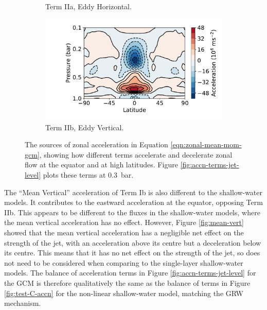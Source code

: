 \begin{figure}
\begin{subfigure}[t]{0.48\textwidth}
    \caption{Term IIa, Eddy Horizontal.}\label{fig:stat-horiz}
  \end{subfigure}
\quad
  \begin{subfigure}[t]{0.48\textwidth}
    \includegraphics[width=\textwidth]{figures/eqm-zonal-flow/3_flux.pdf}
    \caption{Term IIb, Eddy Vertical.}\label{fig:stat-vert}
  \end{subfigure}
  \caption{The sources of zonal acceleration in Equation \ref{eqn:zonal-mean-mom-gcm}, showing how different terms accelerate and decelerate zonal flow at the equator and at high latitudes. Figure \ref{fig:accn-terms-jet-level} plots these terms at \SI{0.3}{\bar}. }\label{fig:default-gcm-accelerations}
\end{figure}


The ``Mean Vertical'' acceleration of Term Ib is also different to the shallow-water models. It contributes to the eastward acceleration at the equator, opposing Term IIb. This appears to be different to the fluxes in the shallow-water models, where the mean vertical acceleration has no effect. However, Figure \ref{fig:mean-vert} showed that the mean vertical acceleration has a negligible net effect on the strength of the jet, with an acceleration above its centre but a deceleration below its centre. This means that it has no net effect on the strength of the jet, so does not need to be considered when comparing to the single-layer shallow-water models. The balance of acceleration terms in Figure \ref{fig:accn-terms-jet-level} for the GCM is therefore qualitatively the same as the balance of terms in Figure \ref{fig:test-C-accn} for the non-linear shallow-water model, matching the GRW mechanism.

%



